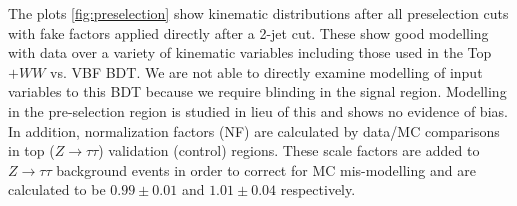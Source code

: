 The plots \ref{fig:preselection} show kinematic distributions after all preselection cuts with fake factors applied directly after a 2-jet cut. These show good modelling with data over a variety of kinematic variables including those used in the Top$+WW$ vs. VBF BDT. We are not able to directly examine modelling of input variables to this BDT because we require blinding in the signal region. Modelling in the pre-selection region is studied in lieu of this and shows no evidence of bias. In addition, normalization factors (NF) are calculated by data/MC comparisons in top ($Z\rightarrow\tau\tau$) validation (control) regions. These scale factors are added to $Z\rightarrow\tau\tau$ background events in order to correct for MC mis-modelling and are calculated to be $0.99\pm0.01$ and $1.01\pm0.04$ respectively. 

\begin{figure}[!h]
  \hfill
  \hfill
  \hfill
\end{figure}

